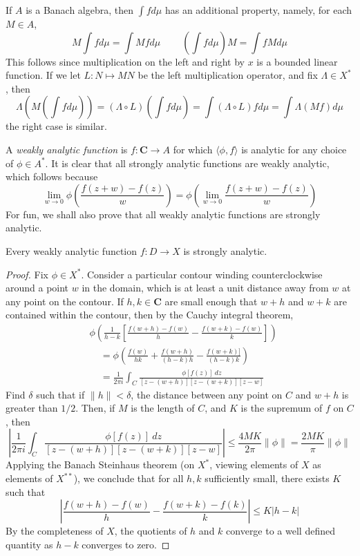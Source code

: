If $A$ is a Banach algebra, then $\int f d\mu$ has an additional property, namely, for each $M \in A$,
%
\[ M \int f d\mu = \int Mf d\mu\ \ \ \ \ \ \ \ \ \ \left(\int f d\mu\right) M = \int fM d\mu \]
%
This follows since multiplication on the left and right by $x$ is a bounded linear function. If we let $L: N \mapsto MN$ be the left multiplication operator, and fix $\Lambda \in X^*$, then
%
\[ \Lambda \left( M \left( \int f d\mu \right) \right) = (\Lambda \circ L) \left( \int f d\mu \right) = \int (\Lambda \circ L) f d\mu = \int \Lambda(Mf) d\mu \]
%
the right case is similar.


\newpage

 A \emph{weakly analytic function} is $f: \mathbf{C} \to A$ for which $\langle \phi, f \rangle$ is analytic for any choice of $\phi \in A^*$. It is clear that all strongly analytic functions are weakly analytic, which follows because
%
\[ \lim_{w \to 0} \phi \left( \frac{f(z + w) - f(z)}{w} \right) = \phi \left( \lim_{w \to 0} \frac{f(z + w) - f(z)}{w} \right) \]
%
For fun, we shall also prove that all weakly analytic functions are strongly analytic.

\begin{theorem}
    Every weakly analytic function $f: D \to X$ is strongly analytic.
\end{theorem}
\begin{proof}
    Fix $\phi \in X^*$. Consider a particular contour winding counterclockwise around a point $w$ in the domain, which is at least a unit distance away from $w$ at any point on the contour. If $h,k \in \mathbf{C}$ are small enough that $w + h$ and $w + k$ are contained within the contour, then by the Cauchy integral theorem,
    \begin{align*}
        &\phi\left( \frac{1}{h-k} \left[ \frac{f(w + h) - f(w)}{h} - \frac{f(w + k) - f(w)}{k} \right] \right)\\
        &\ \ \ \ \ =  \phi \left( \frac{f(w)}{hk} + \frac{f(w + h)}{(h - k)h} - \frac{f(w + k)]}{(h - k)k} \right)\\
        &\ \ \ \ \ = \frac{1}{2\pi i} \int_C \frac{\phi[f(z)]\ dz}{[z - (w + h)][z - (w + k)][z - w]}
    \end{align*}
    Find $\delta$ such that if $\| h \| < \delta$, the distance between any point on $C$ and $w + h$ is greater than $1/2$. Then, if $M$ is the length of $C$, and $K$ is the supremum of $f$ on $C$, then
    \[ \left| \frac{1}{2\pi i} \int_C \frac{\phi[f(z)]\ dz}{[z - (w + h)][z - (w + k)][z - w]}\right| \leq \frac{4MK}{2 \pi} \| \phi \| = \frac{2MK}{\pi} \| \phi \| \]
    Applying the Banach Steinhaus theorem (on $X^*$, viewing elements of $X$ as elements of $X^{**}$), we conclude that for all $h,k$ sufficiently small, there exists $K$ such that
    \[ \left| \frac{f(w + h) - f(w)}{h} - \frac{f(w + k) - f(k)}{k} \right| \leq K |h - k| \]
    By the completeness of $X$, the quotients of $h$ and $k$ converge to a well defined quantity as $h - k$ converges to zero.
\end{proof}











